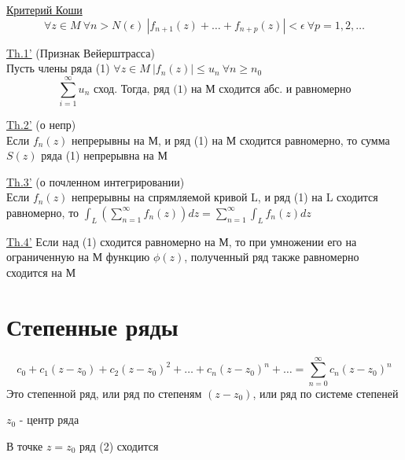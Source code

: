 \documentclass[a4paper]{article}
\begin{document}
\begin{tcolorbox}
\underline{Критерий Коши}
\[
    \forall z \in M \ \forall n > N(\epsilon) \ | f_{n+1}(z) + \dots + f_{n+p}(z)|
    < \epsilon \ \forall p = 1, 2, \dots
\]
\end{tcolorbox}

\begin{tcolorbox}
\underline{Th.1'} (Признак Вейерштрасса)\\
Пусть члены ряда (1) $ \forall z \in M \ |f_n(z)| \leq u_n \ \forall n \geq n_0 $ 
\[
    \sum_{i=1}^{\infty} u_n \text{ сход. Тогда, ряд (1) на М сходится абс. и равномерно}
\]
\end{tcolorbox}

\begin{tcolorbox}
\underline{Th.2'} (о непр)\\
Если $ f_n(z) $ непрерывны на М, и ряд (1) на М сходится равномерно, то сумма
$ S(z) $ ряда (1) непрерывна на М
\end{tcolorbox}

\begin{tcolorbox}
\underline{Th.3'} (о почленном интегрировании)\\
Если $ f_n(z) $ непрерывны на спрямляемой кривой L, и ряд (1) на L сходится равномерно,
то $ \int_{L} \left(\sum_{n=1}^{\infty} f_n(z)\right) dz = \sum_{n=1}^{\infty} 
\int_L f_n(z)dz$ 
\end{tcolorbox}

\begin{tcolorbox}
\underline{Th.4'} Если над (1) сходится равномерно на М, то при умножении его на 
ограниченную на М функцию $ \phi(z) $, полученный ряд также равномерно сходится на 
М
\end{tcolorbox}

\section*{\centering Степенные ряды}
\begin{tcolorbox}
\begin{equation}
    c_0 + c_1(z - z_0) + c_2 (z - z_0)^2 + \dots + c_n(z-z_0)^{n} + \dots = 
    \sum_{n=0}^{\infty} c_n(z-z_0)^{n}
\end{equation}
Это степенной ряд, или ряд по степеням $ (z - z_0) $, или ряд по системе степеней

$ z_0 $ - центр ряда

В точке $ z = z_0 $ ряд (2) сходится
\end{tcolorbox}
\end{document}
